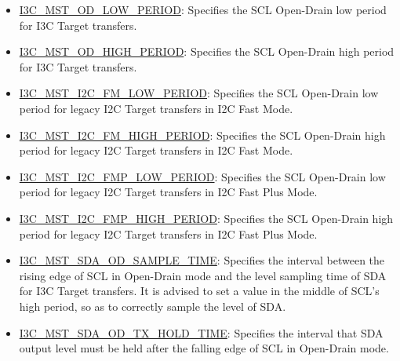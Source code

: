 \documentclass[main\_\_EN.tex]{subfiles}
\begin{document}
\begin{itemize}
    \item \hyperref[fielddesc:I3CMSTREGI3CMSTODLOWPERIOD]{I3C\_MST\_OD\_LOW\_PERIOD}: Specifies the SCL Open-Drain low period for I3C Target transfers.
    \item \hyperref[fielddesc:I3CMSTREGI3CMSTODHIGHPERIOD]{I3C\_MST\_OD\_HIGH\_PERIOD}: Specifies the SCL Open-Drain high period for I3C Target transfers.
    \item \hyperref[fielddesc:I3CMSTREGI2CFMLOWPERIOD]{I3C\_MST\_I2C\_FM\_LOW\_PERIOD}: Specifies the SCL Open-Drain low period for legacy I2C Target transfers in I2C Fast Mode.
    \item \hyperref[fielddesc:I3CMSTREGI2CFMHIGHPERIOD]{I3C\_MST\_I2C\_FM\_HIGH\_PERIOD}: Specifies the SCL Open-Drain high period for legacy I2C Target transfers in I2C Fast Mode.
    \item \hyperref[fielddesc:I3CMSTREGI2CFMPLOWPERIOD]{I3C\_MST\_I2C\_FMP\_LOW\_PERIOD}: Specifies the SCL Open-Drain low period for legacy I2C Target transfers in I2C Fast Plus Mode.
    \item \hyperref[fielddesc:I3CMSTREGI2CFMPHIGHPERIOD]{I3C\_MST\_I2C\_FMP\_HIGH\_PERIOD}: Specifies the SCL Open-Drain high period for legacy I2C Target transfers in I2C Fast Plus Mode.
    \item \hyperref[fielddesc:I3CMSTREGSDAODSAMPLETIME]{I3C\_MST\_SDA\_OD\_SAMPLE\_TIME}: Specifies the interval between the rising edge of SCL in Open-Drain mode and the level sampling time of SDA for I3C Target transfers. It is advised to set a value in the middle of SCL's high period, so as to correctly sample the level of SDA.
    \item \hyperref[fielddesc:I3CMSTREGSDAODTXHOLDTIME]{I3C\_MST\_SDA\_OD\_TX\_HOLD\_TIME}: Specifies the interval that SDA output level must be held after the falling edge of SCL in Open-Drain mode.
\end{itemize}
\end{document}
